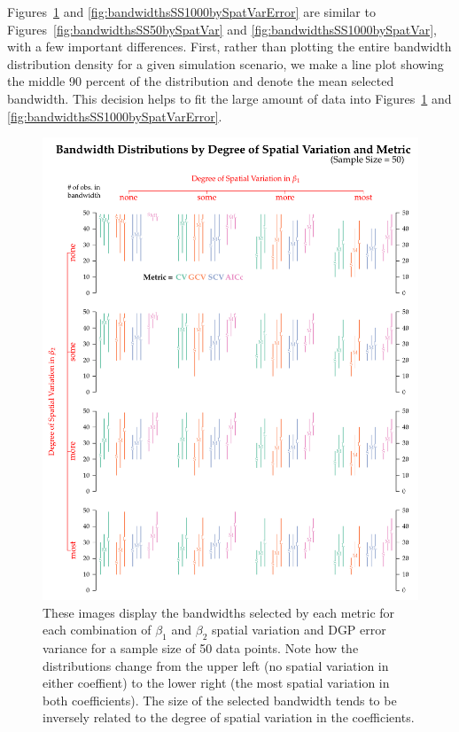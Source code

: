 \documentclass{article}\usepackage{graphicx, color}
\begin{document}
Figures~\ref{fig:bandwidthsSS50bySpatVarError} and \ref{fig:bandwidthsSS1000bySpatVarError} are similar to Figures~\ref{fig:bandwidthsSS50bySpatVar} and \ref{fig:bandwidthsSS1000bySpatVar}, with a few important differences. First, rather than plotting the entire bandwidth distribution density for a given simulation scenario, we make a line plot showing the middle 90 percent of the distribution and denote the mean selected bandwidth. This decision helps to fit the large amount of data into Figures~\ref{fig:bandwidthsSS50bySpatVarError} and \ref{fig:bandwidthsSS1000bySpatVarError}.




\begin{figure}\label{fig:bandwidthsSS50bySpatVarError}
\includegraphics{figure/bandwidthsSS50bySpatVarError.pdf}
\caption{These images display the bandwidths selected by each metric for each combination of $\beta _1$ and $\beta _2$ spatial variation and DGP error variance for a sample size of 50 data points. Note how the distributions change from the upper left (no spatial variation in either coeffient) to the lower right (the most spatial variation in both coefficients). The size of the selected bandwidth tends to be inversely related to the degree of spatial variation in the coefficients.}
\end{figure}
\end{document}
